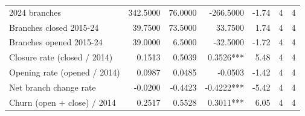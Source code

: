 \begin{tabular}{lrrrrrr}
2024 branches & 342.5000 & 76.0000 & -266.5000 & -1.74 & 4 & 4 \\
Branches closed 2015-24 & 39.7500 & 73.5000 & 33.7500 & 1.74 & 4 & 4 \\
Branches opened 2015-24 & 39.0000 & 6.5000 & -32.5000 & -1.72 & 4 & 4 \\
Closure rate (closed / 2014) & 0.1513 & 0.5039 & 0.3526*** & 5.48 & 4 & 4 \\
Opening rate (opened / 2014) & 0.0987 & 0.0485 & -0.0503 & -1.42 & 4 & 4 \\
Net branch change rate & -0.0200 & -0.4423 & -0.4222*** & -5.42 & 4 & 4 \\
Churn (open + close) / 2014 & 0.2517 & 0.5528 & 0.3011*** & 6.05 & 4 & 4 \\
\bottomrule
\end{tabular}


